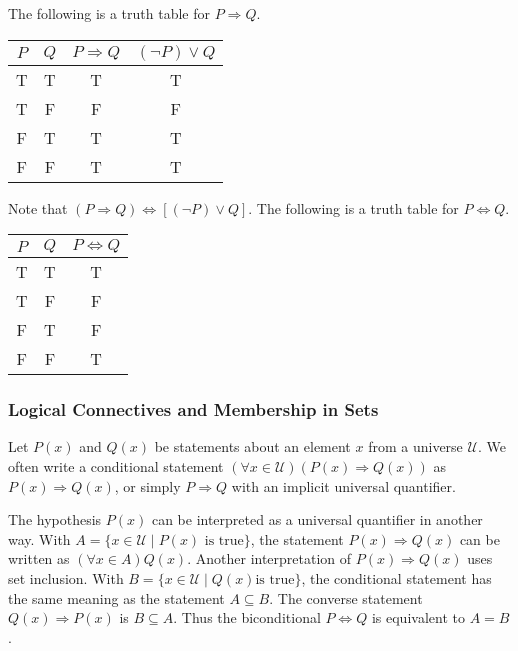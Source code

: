 \documentclass[../main.tex]{subfiles}
\begin{document}
The following is a truth table for $P \Rightarrow Q$.
\begin{table}[H]
    \centering
    \begin{tabular}{c|c|c|c}
        $P$ & $Q$ & $P \Rightarrow Q$ & $(\neg P) \vee Q$ \\ \hline
        T   & T   & T                 & T                 \\
        T   & F   & F                 & F                 \\
        F   & T   & T                 & T                 \\
        F   & F   & T                 & T
    \end{tabular}
\end{table}
Note that $(P \Rightarrow Q) \Leftrightarrow [(\neg P) \vee Q]$.
The following is a truth table for $P \Leftrightarrow Q$.
\begin{table}[H]
    \centering
    \begin{tabular}{c|c|c}
        $P$ & $Q$ & $P \Leftrightarrow Q$ \\ \hline
        T   & T   & T                     \\
        T   & F   & F                     \\
        F   & T   & F                     \\
        F   & F   & T
    \end{tabular}
\end{table}

\subsubsection{Logical Connectives and Membership in Sets}
Let $P(x)$ and $Q(x)$ be statements about an element $x$ from a universe $\mathcal U$.
We often write a conditional statement $(\forall x \in \mathcal{U})(P(x) \Rightarrow Q(x))$ as $P(x) \Rightarrow Q(x)$, or simply $P \Rightarrow Q$ with an implicit universal quantifier.

The hypothesis $P(x)$ can be interpreted as a universal quantifier in another way.
With $A = \{ x \in \mathcal{U} \mid P(x) \text{ is true}\}$, the statement $P(x) \Rightarrow Q(x)$ can be written as $(\forall x \in A) Q(x)$.
Another interpretation of $P(x) \Rightarrow Q(x)$ uses set inclusion.
With $B = \{ x \in \mathcal{U} \mid Q(x) \text{is true}\}$, the conditional statement has the same meaning as the statement $A \subseteq B$.
The converse statement $Q(x) \Rightarrow P(x)$ is $B \subseteq A$.
Thus the biconditional $P \Leftrightarrow Q$ is equivalent to $A = B$.
\end{document}
